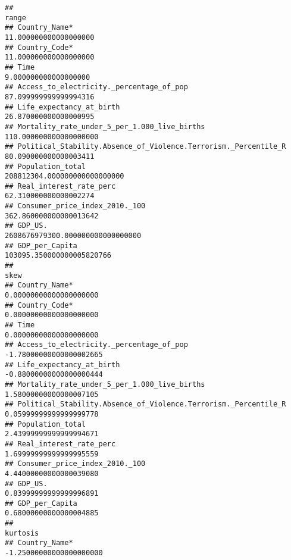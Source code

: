 \documentclass[
]{article}
\begin{document}
\begin{verbatim}
##                                                                                            range
## Country_Name*                                                              11.000000000000000000
## Country_Code*                                                              11.000000000000000000
## Time                                                                        9.000000000000000000
## Access_to_electricity._percentage_of_pop                                   87.099999999999994316
## Life_expectancy_at_birth                                                   26.870000000000000995
## Mortality_rate_under_5_per_1.000_live_births                              110.000000000000000000
## Political_Stability.Absence_of_Violence.Terrorism._Percentile_R            80.090000000000003411
## Population_total                                                    208812304.000000000000000000
## Real_interest_rate_perc                                                    62.310000000000002274
## Consumer_price_index_2010._100                                            362.860000000000013642
## GDP_US.                                                         2608676979300.000000000000000000
## GDP_per_Capita                                                         103095.350000000005820766
##                                                                                    skew
## Country_Name*                                                    0.00000000000000000000
## Country_Code*                                                    0.00000000000000000000
## Time                                                             0.00000000000000000000
## Access_to_electricity._percentage_of_pop                        -1.78000000000000002665
## Life_expectancy_at_birth                                        -0.88000000000000000444
## Mortality_rate_under_5_per_1.000_live_births                     1.58000000000000007105
## Political_Stability.Absence_of_Violence.Terrorism._Percentile_R  0.05999999999999999778
## Population_total                                                 2.43999999999999994671
## Real_interest_rate_perc                                          1.69999999999999995559
## Consumer_price_index_2010._100                                   4.44000000000000039080
## GDP_US.                                                          0.83999999999999996891
## GDP_per_Capita                                                   0.68000000000000004885
##                                                                                kurtosis
## Country_Name*                                                   -1.25000000000000000000

\end{verbatim}
\end{document}
